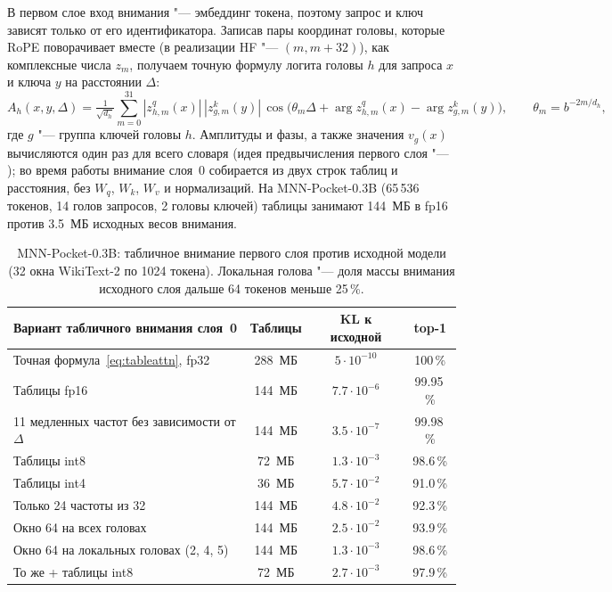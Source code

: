 В первом слое вход внимания "--- эмбеддинг токена, поэтому запрос и ключ
зависят только от его идентификатора. Записав пары координат головы,
которые RoPE поворачивает вместе (в реализации HF "--- $(m, m{+}32)$), как
комплексные числа $z_m$, получаем точную формулу логита головы $h$ для
запроса $x$ и ключа $y$ на расстоянии $\Delta$:
\begin{equation}
A_h(x, y, \Delta) = \tfrac{1}{\sqrt{d_h}} \sum_{m=0}^{31}
|z^q_{h,m}(x)|\,|z^k_{g,m}(y)|\,
\cos\bigl(\theta_m \Delta + \arg z^q_{h,m}(x) - \arg z^k_{g,m}(y)\bigr),
\qquad \theta_m = b^{-2m/d_h},
\label{eq:tableattn}
\end{equation}
где $g$ "--- группа ключей головы $h$. Амплитуды и фазы, а также значения
$v_g(x)$ вычисляются один раз для всего словаря (идея предвычисления первого
слоя "--- \cite{graef2024precompute}); во время работы внимание слоя~0
собирается из двух строк таблиц и расстояния, без $W_q$, $W_k$, $W_v$ и
нормализаций. На MNN-Pocket-0.3B (65\,536 токенов, 14 голов запросов, 2 головы
ключей) таблицы занимают 144~МБ в fp16 против 3.5~МБ исходных весов внимания.

\begin{table}[t]
\centering
\small
\begin{tabular}{lccc}
\toprule
Вариант табличного внимания слоя~0 & Таблицы & KL к исходной & top-1 \\
\midrule
Точная формула~\eqref{eq:tableattn}, fp32 & 288~МБ & $5\cdot10^{-10}$ & 100\,\% \\
Таблицы fp16 & 144~МБ & $7.7\cdot10^{-6}$ & 99.95\,\% \\
11 медленных частот без зависимости от $\Delta$ & 144~МБ & $3.5\cdot10^{-7}$ & 99.98\,\% \\
Таблицы int8 & 72~МБ & $1.3\cdot10^{-3}$ & 98.6\,\% \\
Таблицы int4 & 36~МБ & $5.7\cdot10^{-2}$ & 91.0\,\% \\
Только 24 частоты из 32 & 144~МБ & $4.8\cdot10^{-2}$ & 92.3\,\% \\
Окно 64 на всех головах & 144~МБ & $2.5\cdot10^{-2}$ & 93.9\,\% \\
Окно 64 на локальных головах (2, 4, 5) & 144~МБ & $1.3\cdot10^{-3}$ & 98.6\,\% \\
То же + таблицы int8 & 72~МБ & $2.7\cdot10^{-3}$ & 97.9\,\% \\
\bottomrule
\end{tabular}
\caption{MNN-Pocket-0.3B: табличное внимание первого слоя против исходной модели
(32 окна WikiText-2 по 1024 токена). Локальная голова "--- доля массы внимания
исходного слоя дальше 64 токенов меньше 25\,\%.}
\label{tab:tableattn}
\end{table}

